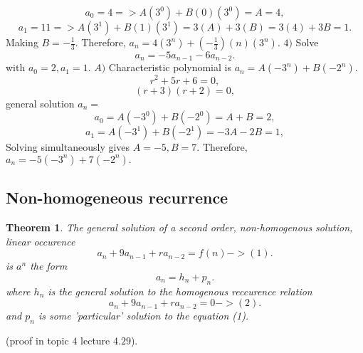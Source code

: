 \documentclass{article}
\newtheorem{theorem}{Theorem}                                       %
\begin{document}
$$a_0 = 4 => A(3^0) + B(0)(3^0) = A = 4,$$
$$a_1 = 11 => A(3^1) + B(1)(3^1) = 3(A) + 3(B) = 3(4) + 3B = 1.$$
Making $B = -\frac{1}{3}$. Therefore, $a_n = 4(3^n) + (-\frac{1}{3})(n)(3^n).$
\newline
\newline
$4) $ Solve 
$$a_n = -5a_{n - 1} - 6a_{n - 2}.$$
with $a_0 = 2, a_1 = 1.$
\newline
\newline
$A) $ Characteristic polynomial is $a_n = A(-3^n) + B(-2^n).$
$$r^2 + 5r + 6 = 0,$$
$$(r + 3)(r + 2) = 0,$$
general solution $a_n = $
$$a_0 = A(-3^0) + B(-2^0) = A + B = 2,$$
$$a_1 = A(-3^1) + B(-2^1) = -3A - 2B = 1,$$
Solving simultaneously gives $A = -5, B = 7.$ Therefore, $a_n = -5(-3^n) + 7(-2^n).$
\newpage
\subsection{Non-homogeneous recurrence}
\begin{theorem}
  The general solution of a second order, non-homogenous solution, linear occurence
  $$a_n + 9a_{n - 1} + ra_{n - 2} = f(n) -> (1).$$
  is $a^n$ the form
  $$a_n = h_n + p_n.$$
  where $h_n$ is the general solution to the homogenous reccurence relation
  $$a_n + 9a_{n - 1} + ra_{n - 2} = 0 -> (2).$$
  and $p_n$ is some 'particular' solution to the equation (1).
\end{theorem}
(proof in topic $4$ lecture $4.29$).
\newpage
\end{document}

